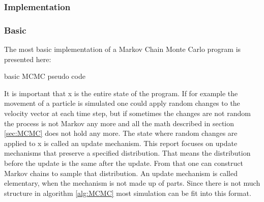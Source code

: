 \documentclass[english]{uzhpub}
\begin{document}
\subsubsection{Implementation}
\subsubsection*{Basic}

The most basic implementation of a Markov Chain Monte Carlo program is presented here:
\begin{algorithm}[H]
 \caption{basic MCMC pseudo code}
 \label{alg:MCMC}
 \begin{algorithmic}
  \Loop {}
  \EndLoop
 \end{algorithmic}
\end{algorithm}
It is important that x is the entire state of the program.
If for example the movement of a particle is simulated one could apply random changes to the velocity vector at each time step, but if sometimes the changes are not random the process is not Markov any more and all the math described in section \ref{sec:MCMC} does not hold any more.
The state where random changes are applied to x is called an update mechanism. This report focuses on update mechanisms that preserve a specified distribution. That means the distribution before the update is the same after the update. From that one can construct Markov chains to sample that distribution. An update mechanism is called elementary, when the mechanism is not made up of parts. Since there is not much structure in algorithm \ref{alg:MCMC} most simulation can be fit into this format.
\end{document}
